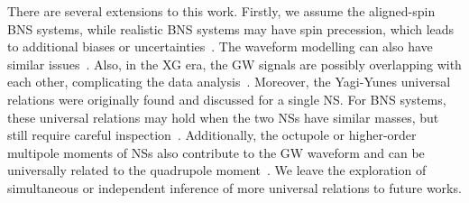 \documentclass[a4paper,11pt]{article}
\begin{document}
There are several extensions to this work. Firstly, we assume the aligned-spin BNS systems, while
realistic BNS systems may have spin precession, which leads to additional
biases or uncertainties~\cite{Williamson:2017evr}. The waveform modelling can
also have similar issues~\cite{Purrer:2019jcp,Gamba:2020wgg}. 
Also, in the XG era, the GW signals are possibly overlapping with each
other, complicating the data analysis~\cite{Pizzati:2021apa, Samajdar:2021egv,
Wang:2023ldq, Johnson:2024foj, Wang:2025ckw}.
Moreover, the Yagi-Yunes universal relations were originally found and discussed
for a single NS. For BNS systems, these universal relations may hold when the
two NSs have similar masses, but still require careful
inspection~\cite{Shao:2022koz, Saffer:2021gak}. Additionally, the octupole or
higher-order multipole moments of NSs also contribute to the GW waveform and can
be universally related to the quadrupole moment~\cite{Yagi_2017,Abac:2023ujg}.
We leave the exploration of simultaneous or independent inference of more
universal relations to future works.

\acknowledgments

\clearpage


% 

\end{document}
